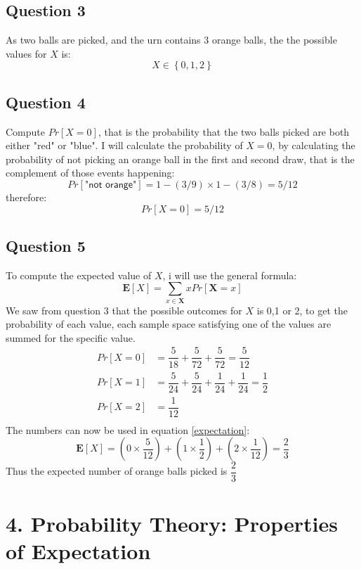 \documentclass{article}
\begin{document}
\subsection{Question 3}
As two balls are picked, and the urn contains 3 orange balls, the the possible values for $X$ is:
$$ X \in \left\lbrace 0,1,2 \right\rbrace $$
\subsection{Question 4}
Compute $Pr[X = 0]$, that is the probability that the two balls picked are both either "red" or "blue". I will calculate the probability of $X = 0$, by calculating the probability of not picking an orange ball in the first and second draw, that is the complement of those events happening:
$$ Pr[\textsf{"not orange"}] = 1-(3/9) \times 1-(3/8) = 5/12 $$
therefore:
$$ Pr[X=0] = 5/12 $$
\subsection{Question 5}
To compute the expected value of $X$, i will use the general formula:
\begin{equation}
\mathbf{E}[X] = \sum\limits_{x \in \mathbf{X}} x  Pr[\mathbf{X} = x]
\label{expectation}
\end{equation}
We saw from question 3 that the possible outcomes for $X$ is 0,1 or 2, to get the probability of each value, each sample space satisfying one of the values are summed for the specific value.
\begin{align*}
Pr[X=0] &= \dfrac{5}{18} + \dfrac{5}{72} + \dfrac{5}{72} = \dfrac{5}{12} \\
Pr[X=1] &= \dfrac{5}{24} + \dfrac{5}{24} + \dfrac{1}{24} + \dfrac{1}{24} = \dfrac{1}{2} \\
Pr[X=2] &= \dfrac{1}{12} \\
\end{align*}
The numbers can now be used in equation \eqref{expectation}:
$$
\mathbf{E}[X] = (0 \times \dfrac{5}{12}) + (1 \times \dfrac{1}{2}) + (2 \times \dfrac{1}{12}) = \dfrac{2}{3}
$$
Thus the expected number of orange balls picked is $ \dfrac{2}{3}$
\section{4. Probability Theory: Properties of Expectation }
\end{document}
